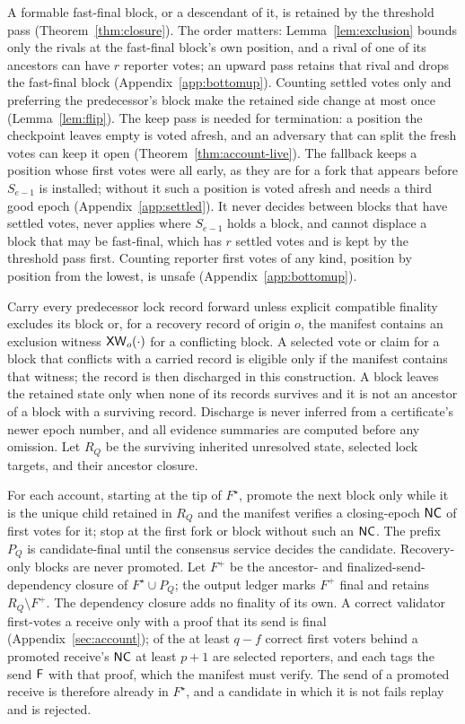 A formable fast-final block, or a descendant of it, is retained by the threshold pass (Theorem~\ref{thm:closure}). The order matters: Lemma~\ref{lem:exclusion} bounds only the rivals at the fast-final block's own position, and a rival of one of its ancestors can have $r$ reporter votes; an upward pass retains that rival and drops the fast-final block (Appendix~\ref{app:bottomup}). Counting settled votes only and preferring the predecessor's block make the retained side change at most once (Lemma~\ref{lem:flip}). The keep pass is needed for termination: a position the checkpoint leaves empty is voted afresh, and an adversary that can split the fresh votes can keep it open (Theorem~\ref{thm:account-live}). The fallback keeps a position whose first votes were all early, as they are for a fork that appears before $S_{e-1}$ is installed; without it such a position is voted afresh and needs a third good epoch (Appendix~\ref{app:settled}). It never decides between blocks that have settled votes, never applies where $S_{e-1}$ holds a block, and cannot displace a block that may be fast-final, which has $r$ settled votes and is kept by the threshold pass first. Counting reporter first votes of any kind, position by position from the lowest, is unsafe (Appendix~\ref{app:bottomup}).

Carry every predecessor lock record forward unless explicit compatible finality excludes its block or, for a recovery record of origin $o$, the manifest contains an exclusion witness $\mathsf{XW}_o(\cdot)$ for a conflicting block. A selected vote or claim for a block that conflicts with a carried record is eligible only if the manifest contains that witness; the record is then discharged in this construction. A block leaves the retained state only when none of its records survives and it is not an ancestor of a block with a surviving record. Discharge is never inferred from a certificate's newer epoch number, and all evidence summaries are computed before any omission. Let $R_Q$ be the surviving inherited unresolved state, selected lock targets, and their ancestor closure.

For each account, starting at the tip of $F^\star$, promote the next block only while it is the unique child retained in $R_Q$ and the manifest verifies a closing-epoch $\mathsf{NC}$ of first votes for it; stop at the first fork or block without such an $\mathsf{NC}$. The prefix $P_Q$ is candidate-final until the consensus service decides the candidate. Recovery-only blocks are never promoted. Let $F^+$ be the ancestor- and finalized-send-dependency closure of $F^\star\cup P_Q$; the output ledger marks $F^+$ final and retains $R_Q\setminus F^+$. The dependency closure adds no finality of its own. A correct validator first-votes a receive only with a proof that its send is final (Appendix~\ref{sec:account}); of the at least $q-f$ correct first voters behind a promoted receive's $\mathsf{NC}$ at least $p+1$ are selected reporters, and each tags the send $\mathsf{F}$ with that proof, which the manifest must verify. The send of a promoted receive is therefore already in $F^\star$, and a candidate in which it is not fails replay and is rejected.


